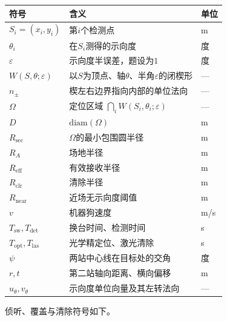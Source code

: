 \documentclass{cumcmthesis}
\begin{document}
\begin{center}
\begin{tabular}{@{}>{\raggedright\arraybackslash}p{}>{\raggedright\arraybackslash}p{}p{}@{}}
\toprule
符号 & 含义 & 单位 \\
\midrule
$S_i=(x_i,y_i)$ & 第$i$个检测点 & m \\
$\theta_i$ & 在$S_i$测得的示向度 & 度 \\
$\varepsilon$ & 示向度半误差，题设为$1$ & 度 \\
$W(S,\theta;\varepsilon)$ & 以$S$为顶点、轴$\theta$、半角$\varepsilon$的闭楔形 & --- \\
$n_\pm$ & 楔左右边界指向内部的单位法向 & --- \\
$\Omega$ & 定位区域 $\bigcap_i W(S_i,\theta_i;\varepsilon)$ & --- \\
$D$ & $\mathrm{diam}(\Omega)$ & m \\
$R_{\mathrm{sec}}$ & $\Omega$的最小包围圆半径 & m \\
$R_A$ & 场地半径 & m \\
$R_{\mathrm{eff}}$ & 有效接收半径 & m \\
$R_{\mathrm{clr}}$ & 清除半径 & m \\
$R_{\mathrm{near}}$ & 近场无示向度阈值 & m \\
$v$ & 机器狗速度 & m/s \\
$T_{\mathrm{sw}},T_{\mathrm{det}}$ & 换台时间、检测时间 & s \\
$T_{\mathrm{opt}},T_{\mathrm{las}}$ & 光学精定位、激光清除 & s \\
$\psi$ & 两站中心线在目标处的交角 & 度 \\
$r,t$ & 第二站轴向距离、横向偏移 & m \\
$u_{\theta},v_{\theta}$ & 示向度单位向量及其左转法向 & --- \\
\bottomrule
\end{tabular}
\end{center}

侦听、覆盖与清除符号如下。
\end{document}
